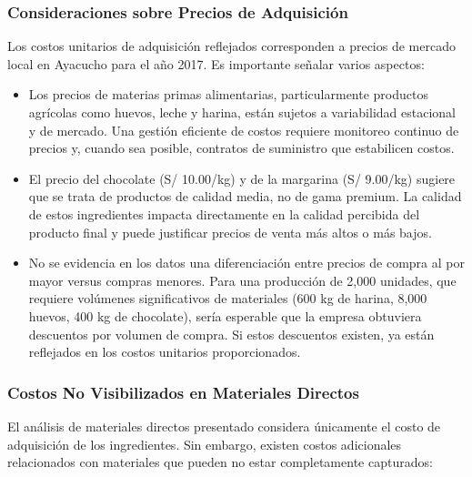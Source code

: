 \documentclass[
  stu,
  floatsintext,
  longtable,
  a4paper,
  nolmodern,
  notxfonts,
  notimes,
  12pt,
  colorlinks=true,linkcolor=blue,citecolor=blue,urlcolor=blue]{apa7}
\begin{document}
\subsubsection{Consideraciones sobre Precios de
Adquisición}\label{consideraciones-sobre-precios-de-adquisiciuxf3n}

Los costos unitarios de adquisición reflejados corresponden a precios de
mercado local en Ayacucho para el año 2017. Es importante señalar varios
aspectos:

\begin{itemize}
\item
  Los precios de materias primas alimentarias, particularmente productos
  agrícolas como huevos, leche y harina, están sujetos a variabilidad
  estacional y de mercado. Una gestión eficiente de costos requiere
  monitoreo continuo de precios y, cuando sea posible, contratos de
  suministro que estabilicen costos.
\item
  El precio del chocolate (S/ 10.00/kg) y de la margarina (S/ 9.00/kg)
  sugiere que se trata de productos de calidad media, no de gama
  premium. La calidad de estos ingredientes impacta directamente en la
  calidad percibida del producto final y puede justificar precios de
  venta más altos o más bajos.
\item
  No se evidencia en los datos una diferenciación entre precios de
  compra al por mayor versus compras menores. Para una producción de
  2,000 unidades, que requiere volúmenes significativos de materiales
  (600 kg de harina, 8,000 huevos, 400 kg de chocolate), sería esperable
  que la empresa obtuviera descuentos por volumen de compra. Si estos
  descuentos existen, ya están reflejados en los costos unitarios
  proporcionados.
\end{itemize}

\subsubsection{Costos No Visibilizados en Materiales
Directos}\label{costos-no-visibilizados-en-materiales-directos}

El análisis de materiales directos presentado considera únicamente el
costo de adquisición de los ingredientes. Sin embargo, existen costos
adicionales relacionados con materiales que pueden no estar
completamente capturados:
\end{document}
